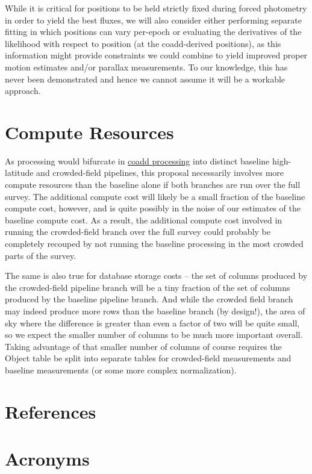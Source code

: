 \documentclass[DM,authoryear,toc]{lsstdoc}
\begin{document}
While it is critical for positions to be held strictly fixed during forced photometry in order to yield the best fluxes, we will also consider either performing separate fitting in which positions can vary per-epoch or evaluating the derivatives of the likelihood with respect to position (at the coadd-derived positions), as this information might provide constraints we could combine to yield improved proper motion estimates and/or parallax measurements.
To our knowledge, this has never been demonstrated and hence we cannot assume it will be a workable approach.

\section{Compute Resources}

As processing would bifurcate in \hyperref[sec:coadd-processing]{coadd processing} into distinct baseline high-latitude and crowded-field pipelines, this proposal necessarily involves more compute resources than the baseline alone if both branches are run over the full survey.
The additional compute cost will likely be a small fraction of the baseline compute cost, however, and is quite possibly in the noise of our estimates of the baseline compute cost.
As a result, the additional compute cost involved in running the crowded-field branch over the full survey could probably be completely recouped by not running the baseline processing in the most crowded parts of the survey.

The same is also true for database storage costs -- the set of columns produced by the crowded-field pipeline branch will be a tiny fraction of the set of columns produced by the baseline pipeline branch.
And while the crowded field branch may indeed produce more rows than the baseline branch (by design!), the area of sky where the difference is greater than even a factor of two will be quite small, so we expect the smaller number of columns to be much more important overall.
Taking advantage of that smaller number of columns of course requires the Object table be split into separate tables for crowded-field measurements and baseline measurements (or some more complex normalization).

\appendix
\section{References} \label{sec:bib}


\section{Acronyms} \label{sec:acronyms}

\end{document}
